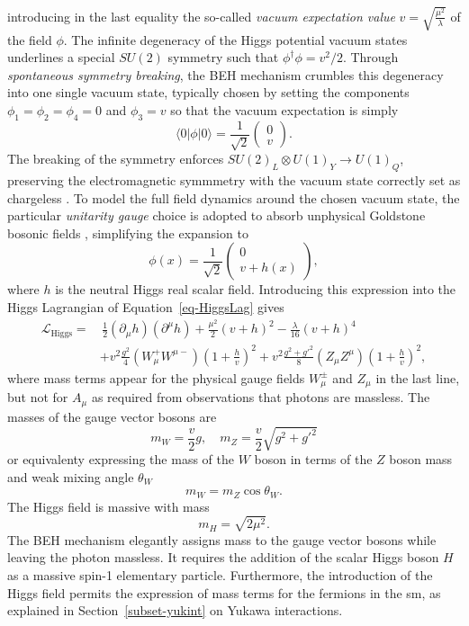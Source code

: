 introducing in the last equality the so-called \textit{vacuum expectation value} $v = \sqrt{\frac{\mu^2}{\lambda}}$ of the field $\phi$. The infinite degeneracy of the Higgs potential vacuum states underlines a special $SU(2)$ symmetry such that $\phi^{\dagger} \phi = v^2/2$. Through \textit{spontaneous symmetry breaking}, the BEH mechanism crumbles this degeneracy into one single vacuum state, typically chosen by setting the components $\phi_1 = \phi_2 = \phi_4 = 0$ and $\phi_3 = v$ so that the vacuum expectation is simply
\begin{equation}
\langle 0|\phi|0 \rangle = \frac{1}{\sqrt{2}} \begin{pmatrix}
        0\\ 
        v
    \end{pmatrix}.
\end{equation}
The breaking of the symmetry enforces $SU(2)_L \otimes U(1)_Y \rightarrow U(1)_Q$, preserving the electromagnetic symmmetry with the vacuum state correctly set as chargeless \cite{DJOUADI20081}. To model the full field dynamics around the chosen vacuum state, the particular \textit{unitarity gauge} \cite{PhysRevD.7.1068} choice is adopted to absorb unphysical Goldstone bosonic fields \cite{Goldstone:343400}, simplifying the expansion to
\begin{equation}
    \phi(x) = \frac{1}{\sqrt{2}} \begin{pmatrix}
            0\\ 
            v + h(x)
        \end{pmatrix},
\end{equation}
where $h$ is the neutral Higgs real scalar field. Introducing this expression into the Higgs Lagrangian of Equation~\ref{eq-HiggsLag} gives
\begin{equation}\label{eq-fullHiggs}
    \begin{split}
        \mathcal{L}_{\text{Higgs}} = & \,\frac{1}{2} (\partial_\mu h)(\partial^\mu h) + \frac{\mu^2}{2}(v+h)^2  - \frac{\lambda}{16}(v+h)^4 \\
        &+ v^2 \frac{g^2}{4} (W_{\mu}^+W^{\mu-})(1+\frac{h}{v})^2 + v^2 \frac{g^2 + {g'}^2}{8}(Z_{\mu}Z^{\mu})(1+\frac{h}{v})^2, 
    \end{split}
\end{equation}
where mass terms appear for the physical gauge fields $W_{\mu}^{\pm}$ and $Z_\mu$ in the last line, but not for $A_{\mu}$ as required from observations that photons are massless. The masses of the gauge vector bosons are
\begin{equation}
    m_W = \frac{v}{2} g , \quad m_Z = \frac{v}{2}\sqrt{g^2 +g'^2} 
\end{equation}
or equivalenty expressing the mass of the $W$ boson in terms of the $Z$ boson mass and weak mixing angle $\theta_W$ \[m_W = m_Z \cos\theta_W.\] The Higgs field is massive with mass \[m_H = \sqrt{2\mu^2}.\] The BEH mechanism elegantly assigns mass to the gauge vector bosons while leaving the photon massless. It requires the addition of the scalar Higgs boson $H$ as a massive spin-1 elementary particle. Furthermore, the introduction of the Higgs field permits the expression of mass terms for the fermions in the \gls{sm}, as explained in Section~\ref{subset-yukint} on Yukawa interactions. 

